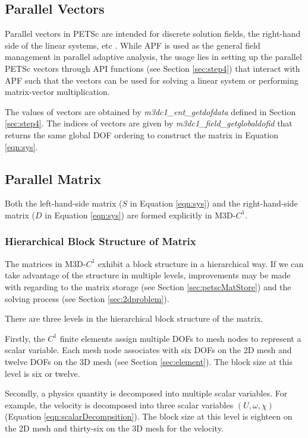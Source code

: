 \documentclass[11pt]{article}  %
\begin{document}
\subsection{Parallel Vectors}
Parallel vectors in PETSc are intended for discrete solution fields, the right-hand side of the linear systems, etc \cite{petsc-ug}. While APF is used as the general field management in parallel adaptive analysis, the usage lies in setting up the  parallel PETSc vectors through API functions (see Section \ref{sec:step4}) that  interact with APF such that the vectors can be used for solving a linear system or performing matrix-vector multiplication.

The values of vectors are obtained by \emph{m3dc1\_ent\_getdofdata} defined in Section \ref{sec:step4}. The indices of vectors are given by \emph{m3dc1\_field\_getglobaldofid} that returns the same global DOF ordering to construct the matrix in Equation \ref{eqn:sys}.

\subsection{Parallel Matrix}
Both the left-hand-side matrix ($S$ in Equation \ref{eqn:sys}) and the right-hand-side matrix ($D$ in Equation \ref{eqn:sys}) are formed explicitly in M3D-$C^1$.

\subsubsection{Hierarchical Block Structure of Matrix } \label{sec:blockstructure}
The matrices in M3D-$C^1$ exhibit a block structure in a hierarchical way.  If we can  take advantage of  the structure in multiple levels,  improvements may be made with regarding to the matrix storage (see Section \ref{sec:petscMatStore})  and the solving process (see Section \ref{sec:2dproblem}). 

There are three levels in the hierarchical block structure of the matrix.

Firstly, the $C^1$ finite elements assign multiple DOFs to mesh nodes to represent a scalar variable.  Each mesh node associates with six DOFs on the 2D mesh and twelve DOFs on the 3D mesh (see Section \ref{sec:element}). The block size at this level is six or twelve.

 Secondly, a physics quantity is decomposed into multiple scalar variables. For example, the velocity is  decomposed into three scalar variables $(U,\omega, \chi)$ (Equation \ref{eqn:scalarDecompsition}). The block size at this level is eighteen on the 2D mesh and thirty-six on the 3D mesh for the velocity. 
 
\end{document}
